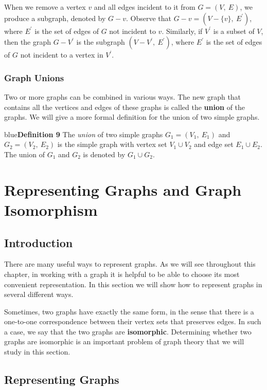 \documentclass[11pt]{article}
\newenvironment{definition}[1]{\begin{mybox}{blue}{\textbf{Definition #1}}}{\end{mybox}}
\begin{document}
When we remove a vertex $v$ and all edges incident to it from $G = (V,\ E)$, we produce a subgraph, denoted by $G - v$. Observe that $G - v = (V - \{v\},\ E^{'})$, where $E^{'}$ is the set of edges of $G$ not incident to $v$. Similarly, if $V^{'}$ is a subset of $V$, then the graph $G - V^{'}$ is the subgraph $(V - V^{'},\ E^{'})$, where $E^{'}$ is the set of edges of $G$ not incident to a vertex in $V^{'}$.

\subsubsection{Graph Unions}

Two or more graphs can be combined in various ways. The new graph that contains all the vertices and edges of these graphs is called the \textbf{union} of the graphs. We will give a more formal definition for the union of two simple graphs.

\begin{definition}{9}
The \textit{union} of two simple graphs $G_1 = (V_1,\ E_1)$ and $G_2 = (V_2,\ E_2)$ is the simple graph with vertex set $V_1 \cup V_2$ and edge set $E_1 \cup E_2$. The union of $G_1$ and $G_2$ is denoted by $G_1 \cup G_2$.
\end{definition}


\section{Representing Graphs and Graph Isomorphism}

\subsection{Introduction}

There are many useful ways to represent graphs. As we will see throughout this chapter, in working with a graph it is helpful to be able to choose its most convenient representation. In this section we will show how to represent graphs in several different ways.

Sometimes, two graphs have exactly the same form, in the sense that there is a one-to-one correspondence between their vertex sets that preserves edges. In such a case, we say that the two graphs are \textbf{isomorphic}. Determining whether two graphs are isomorphic is an important problem of graph theory that we will study in this section.

\subsection{Representing Graphs}
\end{document}
